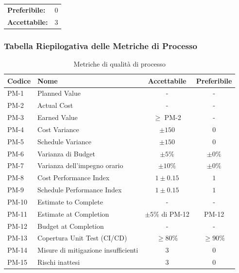 \documentclass[a4paper,11pt,oneside]{scrartcl}
\begin{document}
\noindent
\begin{tabular}{@{}ll@{}}
\textbf{Preferibile:} & $0$ \\
\textbf{Accettabile:} & $3$ \\
\end{tabular}

\subsubsection{Tabella Riepilogativa delle Metriche di Processo}

\begin{table}[H]
\centering
\renewcommand{\arraystretch}{1.3}
\begin{tabularx}{\textwidth}{@{}p{}Xcc@{}}
\toprule
\textbf{Codice} & \textbf{Nome} & \textbf{Accettabile} & \textbf{Preferibile} \\
\midrule
PM-1 & Planned Value & - & - \\
PM-2 & Actual Cost & - & - \\
PM-3 & Earned Value & $\geq$ PM-2 & - \\
PM-4 & Cost Variance & $\pm 150$ & $0$ \\
PM-5 & Schedule Variance & $\pm 150$ & $0$ \\
PM-6 & Varianza di Budget & $\pm 5\%$ & $\pm 0\%$ \\
PM-7 & Varianza dell'impegno orario & $\pm 10\%$ & $\pm 0\%$ \\
PM-8 & Cost Performance Index & $1 \pm 0.15$ & $1$ \\
PM-9 & Schedule Performance Index & $1 \pm 0.15$ & $1$ \\
PM-10 & Estimate to Complete & - & - \\
PM-11 & Estimate at Completion & $\pm 5\%$ di PM-12 & PM-12 \\
PM-12 & Budget at Completion & - & - \\
PM-13 & Copertura Unit Test (CI/CD) & $\ge 80\%$ & $\ge 90\%$ \\
PM-14 & Misure di mitigazione insufficienti & $3$ & $0$ \\
PM-15 & Rischi inattesi & $3$ & $0$ \\
\bottomrule
\end{tabularx}
\caption{Metriche di qualità di processo}
\end{table}

\newpage


\end{document}
